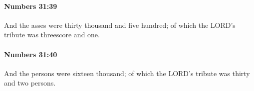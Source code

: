 		\paragraph{Numbers 31:39} %
			\label{NUMBERS-31-39}

			And the asses were thirty thousand and five hundred; of which the LORD’s tribute was threescore and one.


		\paragraph{Numbers 31:40} %
			\label{NUMBERS-31-40}

			And the persons were sixteen thousand; of which the LORD’s tribute was thirty and two persons.


